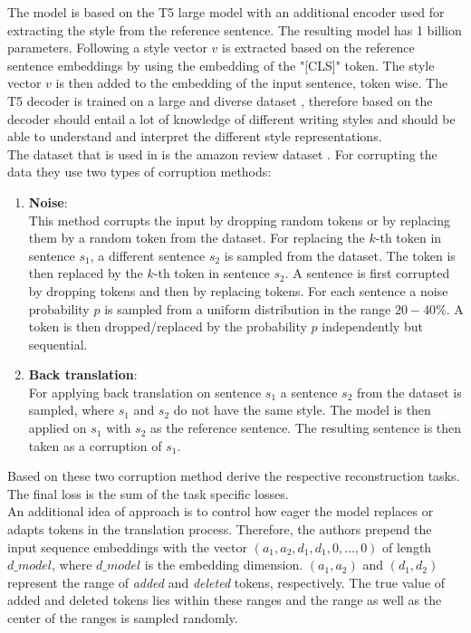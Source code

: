 \documentclass[twocolumn]{tum-article}
\begin{document}
The model is based on the T5 large model with an additional encoder used for extracting the style from the reference sentence. The resulting model has 1 billion parameters. Following \cite{devlin-etal-2019-bert, raffel2019exploring} a style vector $v$ is extracted based on the reference sentence embeddings by using the embedding of the "[CLS]" token. The style vector $v$ is then added to the embedding of the input sentence, token wise. The T5 decoder is trained on a large and diverse dataset \cite{raffel2019exploring}, therefore based on \cite{riley2020textsettr} the decoder should entail a lot of knowledge of different writing styles and should be able to understand and interpret the different style representations.\\
The dataset that is used in \cite{riley2020textsettr} is the amazon review dataset \cite{li2018delete}. For corrupting the data they use two types of corruption methods:
\begin{enumerate}
\item \textbf{Noise}:\\
This method corrupts the input by dropping random tokens or by replacing them by a random token from the dataset. For replacing the $k$-th token in sentence $s_1$, a different sentence $s_2$ is sampled from the dataset. The token is then replaced by the $k$-th token in sentence $s_2$. A sentence is first corrupted by dropping tokens and then by replacing tokens. For each sentence a noise probability $p$ is sampled from a uniform distribution in the range $20-40\%$. A token is then dropped/replaced by the probability $p$ independently but sequential.
\item \textbf{Back translation}:\\
For applying back translation on sentence $s_1$ a sentence $s_2$ from the dataset is sampled, where $s_1$ and $s_2$ do not have the same style. The model is then applied on $s_1$ with $s_2$ as the reference sentence. The resulting sentence is then taken as a corruption of $s_1$. 
\end{enumerate}
Based on these two corruption method \cite{riley2020textsettr} derive the respective reconstruction tasks. The final loss is the sum of the task specific losses.\\
An additional idea of \cite{riley2020textsettr} approach is to control how eager the model replaces or adapts tokens in the translation process. Therefore, the authors prepend the input sequence embeddings with the vector $(a_1, a_2, d_1, d_1, 0, \dots, 0)$ of length $d\_model$, where $d\_model$ is the embedding dimension. $(a_1, a_2)$ and $(d_1, d_2)$ represent the range of \textit{added} and \textit{deleted} tokens, respectively. The true value of added and deleted tokens lies within these ranges and the range as well as the center of the ranges is sampled randomly.\\
\end{document}
